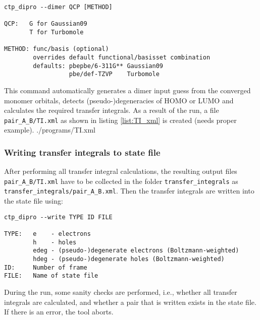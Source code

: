  \begin{verbatim}
ctp_dipro --dimer QCP [METHOD]

QCP:   G for Gaussian09
       T for Turbomole

METHOD: func/basis (optional)
        overrides default functional/basisset combination
        defaults: pbepbe/6-311G** Gaussian09
                  pbe/def-TZVP    Turbomole
\end{verbatim}
This command automatically generates a dimer input guess from the converged monomer orbitals, detects (pseudo-)degeneracies of HOMO or LUMO and calculates the required transfer integrals. As a result of the run, a file {\tt pair\_A\_B/TI.xml} as shown in listing \ref{list:TI_xml} is created (needs proper example).
 {./programs/TI.xml}

\subsubsection{Writing transfer integrals to state file}
After performing all transfer integral calculations, the resulting output files {\tt pair\_A\_B/TI.xml} have to be collected in the folder {\tt transfer\_integrals} as {\tt transfer\_integrals/pair\_A\_B.xml}. Then the transfer integrals are written into the state file using:
\begin{verbatim}
ctp_dipro --write TYPE ID FILE

TYPE:   e    - electrons
        h    - holes
        edeg - (pseudo-)degenerate electrons (Boltzmann-weighted)
        hdeg - (pseudo-)degenerate holes (Boltzmann-weighted)
ID:     Number of frame
FILE:   Name of state file 
\end{verbatim}
During the run, some sanity checks are performed, i.e., whether all transfer integrals are calculated, and whether a pair that is written exists in the state file. If there is an error, the tool aborts.
